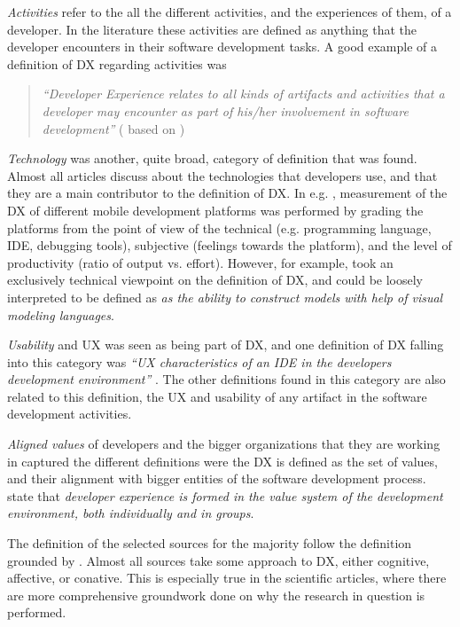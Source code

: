 \documentclass[english, 12pt, a4paper, sci, utf8, a-1b, online]{aaltothesis}
\begin{document}
\textit{Activities} refer to the all the different activities, and the experiences of them, of a developer. In the literature these activities are defined as anything that the developer encounters in their software development tasks. A good example of a definition of DX regarding activities was

\begin{quotation}
  \noindent \textit{``Developer Experience relates to all kinds of artifacts and activities that a developer may encounter as part of his/her involvement in software development''} (\textcite{ekwoge2017tester} based on \textcite{fagerholm-dx-concept-and-definition})
\end{quotation}

\noindent \textit{Technology} was another, quite broad, category of definition that was found.  Almost all articles discuss about the technologies that developers use, and that they are a main contributor to the definition of DX. In e.g. \textcite{nebeling2013informing}, measurement of the DX of different mobile development platforms was performed by grading the platforms from the point of view of the technical (e.g. programming language, IDE, debugging tools), subjective (feelings towards the platform), and the level of productivity (ratio of output vs. effort). However, for example, \textcite{silva-comparing} took an exclusively technical viewpoint on the definition of DX, and could be loosely interpreted to be defined as \textit{as the ability to construct models with help of visual modeling languages}.

\textit{Usability} and UX was seen as being part of DX, and one definition of DX falling into this category was \textit{``UX characteristics of an IDE in the developers development environment''} \parencite{software-developers-as-users}. The other definitions found in this category are also related to this definition, the UX and usability of any artifact in the software development activities.

\textit{Aligned values} of developers and the bigger organizations that they are working in captured the different definitions were the DX is defined as the set of values, and their alignment with bigger entities of the software development process. \parencite{fagerholm2014examining} state that \textit{developer experience is formed in the value system of the development environment, both individually and in groups}.

The definition of the selected sources for the majority follow the definition grounded by \textcite{fagerholm-doctoral-thesis}. Almost all sources take some approach to DX, either cognitive, affective, or conative. This is especially true in the scientific articles, where there are more comprehensive groundwork done on why the research in question is performed.
\end{document}
